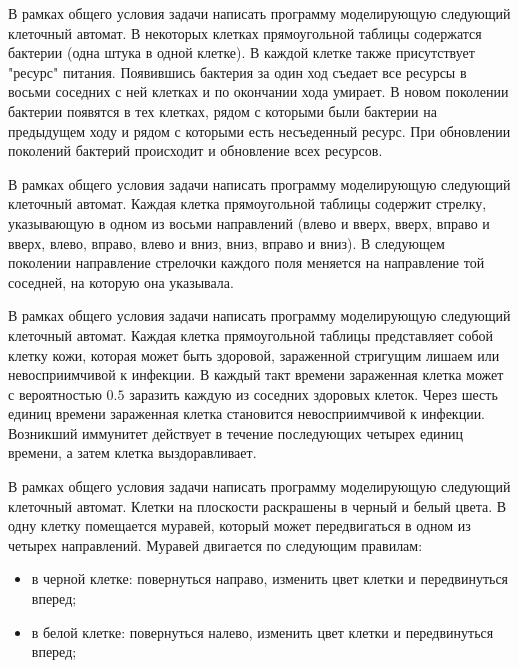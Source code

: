 \begin{zztask}[Ресурсы]
В рамках общего условия задачи написать программу моделирующую следующий 
клеточный автомат.
В некоторых клетках прямоугольной таблицы содержатся бактерии (одна штука
в одной клетке). В каждой клетке также присутствует "ресурс" питания. Появившись 
бактерия за один ход съедает все ресурсы в восьми соседних с ней клетках и по 
окончании хода умирает. В новом поколении бактерии появятся в тех клетках, 
рядом с которыми были бактерии на предыдущем ходу и рядом с которыми есть 
несъеденный ресурс. При обновлении поколений бактерий происходит и обновление 
всех ресурсов.
\end{zztask}

\begin{zztask}[Стрелки]
В рамках общего условия задачи написать программу моделирующую следующий 
клеточный автомат.
Каждая клетка прямоугольной таблицы содержит стрелку, указывающую в одном
из восьми направлений (влево и вверх, вверх, вправо и вверх, влево, вправо,
влево и вниз, вниз, вправо и вниз). В следующем поколении направление 
стрелочки каждого поля меняется на направление той соседней, на которую она 
указывала.
\end{zztask}

\begin{zztask}
В рамках общего условия задачи написать программу моделирующую следующий 
клеточный автомат.
Каждая клетка прямоугольной таблицы представляет собой клетку кожи,
которая может быть здоровой, зараженной стригущим лишаем или невосприимчивой
к инфекции. В каждый такт времени зараженная клетка может с вероятностью $0.5$
заразить каждую из соседних здоровых клеток. Через шесть единиц времени
зараженная клетка становится невосприимчивой к инфекции. Возникший иммунитет 
действует в течение последующих четырех единиц времени, а затем клетка 
выздоравливает.
\end{zztask}

\begin{zztask}
В рамках общего условия задачи написать программу моделирующую следующий 
клеточный автомат. Клетки на плоскости раскрашены в черный и белый цвета.
В одну клетку помещается муравей, который может передвигаться в одном из четырех 
направлений. Муравей двигается по следующим правилам:
\begin{itemize}
	\item в черной клетке: повернуться направо, изменить цвет клетки и передвинуться
	      вперед;
	\item в белой клетке: повернуться налево, изменить цвет клетки и передвинуться
	      вперед;
\end{itemize}
\end{zztask}

